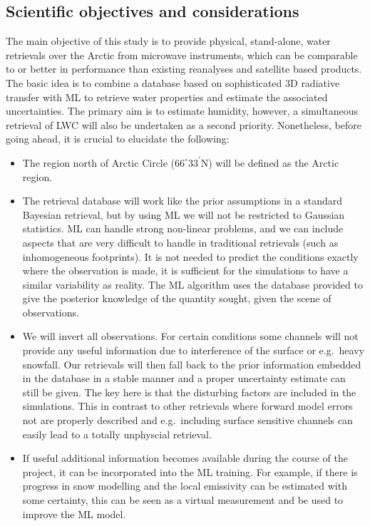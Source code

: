 \documentclass[12pt,oneside,a4paper]{article}
\begin{document}
\subsection{Scientific objectives and considerations}
The main objective of this study is to provide physical, stand-alone, water retrievals over the Arctic from microwave instruments, which can be comparable to or better in performance than existing reanalyses and satellite based products. The basic idea is to combine a database based on sophisticated 3D radiative transfer with ML to retrieve water properties and estimate the associated uncertainties. The primary aim is to estimate humidity, however, a simultaneous retrieval of LWC will also be undertaken as a second priority. Nonetheless, before going ahead, it is crucial to elucidate the following:
\begin{itemize}
 \vspace{-1ex}
\item The region north of Arctic Circle ($66^{\circ}33^{'}$N) will be defined
  as the Arctic region.
 \vspace{-1ex}
\item The retrieval database will work like the prior assumptions in a standard
  Bayesian retrieval, but by using ML we will not be restricted to Gaussian
  statistics. ML can handle strong non-linear problems, and we can include
  aspects that are very difficult to handle in traditional retrievals (such as
  inhomogeneous footprints). It is not needed to predict the conditions exactly
  where the observation is made, it is sufficient for the simulations to have a
  similar variability as reality. The ML algorithm uses the database provided
  to give the posterior knowledge of the quantity sought, given the scene of
  observations.
 \vspace{-1ex}
\item We will invert all observations. For certain conditions some channels
  will not provide any useful information due to interference of the surface or
  e.g.\ heavy snowfall. Our retrievals will then fall back to the prior
  information embedded in the database in a stable manner and a proper
  uncertainty estimate can still be given. The key here is that the disturbing
  factors are included in the simulations. This in contrast to other retrievals
  where forward model errors not are properly described and e.g.\ including
  surface sensitive channels can easily lead to a totally unphyscial retrieval.
  \vspace{-1ex}
\item If useful additional information becomes available during the course of
  the project, it can be incorporated into the ML training. For example, if
  there is progress in snow modelling and the local emissivity can be estimated
  with some certainty, this can be seen as a virtual measurement and be used to
  improve the ML model.
\end{itemize}
\end{document}
